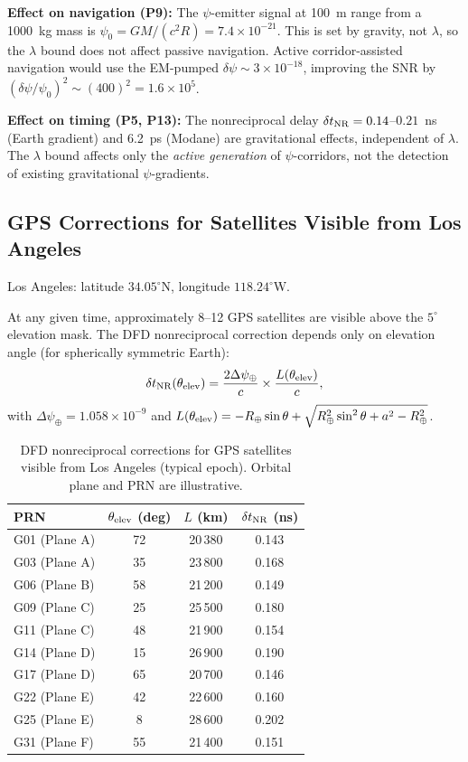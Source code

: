 \documentclass[aps,prd,twocolumn,superscriptaddress,nofootinbib]{revtex4-2}
\begin{document}
\textbf{Effect on navigation (P9):}  The $\psi$-emitter signal at
100~m range from a 1000~kg mass is
$\psi_0 = GM/(c^2 R) = 7.4\times10^{-21}$.  This is set by gravity,
not $\lambda$, so the $\lambda$ bound does not affect passive navigation.
Active corridor-assisted navigation would use the EM-pumped
$\delta\psi \sim 3\times10^{-18}$, improving the SNR by
$(\delta\psi/\psi_0)^2 \sim (400)^2 = 1.6\times10^5$.

\textbf{Effect on timing (P5, P13):}  The nonreciprocal delay
$\delta t_{\rm NR} = 0.14$--$0.21$~ns (Earth gradient) and
6.2~ps (Modane) are gravitational effects, independent of $\lambda$.
The $\lambda$ bound affects only the \emph{active generation} of
$\psi$-corridors, not the detection of existing gravitational
$\psi$-gradients.

\subsection{GPS Corrections for Satellites Visible from Los Angeles}

Los Angeles: latitude $34.05^\circ$N, longitude $118.24^\circ$W.

At any given time, approximately 8--12 GPS satellites are visible above
the $5^\circ$ elevation mask.  The DFD nonreciprocal correction depends
only on elevation angle (for spherically symmetric Earth):
\begin{equation}
\delta t_{\rm NR}(\theta_{\rm elev})
= \frac{2\Delta\psi_\oplus}{c}\times\frac{L(\theta_{\rm elev})}{c},
\end{equation}
with $\Delta\psi_\oplus = 1.058\times10^{-9}$ and
$L(\theta_{\rm elev}) = -R_\oplus\sin\theta + \sqrt{R_\oplus^2\sin^2\theta + a^2 - R_\oplus^2}$.

\begin{table}[h]
\caption{DFD nonreciprocal corrections for GPS satellites visible from
Los Angeles (typical epoch).  Orbital plane and PRN are illustrative.}
\begin{ruledtabular}
\begin{tabular}{lccc}
PRN & $\theta_{\rm elev}$ (deg) & $L$ (km) & $\delta t_{\rm NR}$ (ns) \\
\hline
G01 (Plane A) & 72 & 20\,380 & 0.143 \\
G03 (Plane A) & 35 & 23\,800 & 0.168 \\
G06 (Plane B) & 58 & 21\,200 & 0.149 \\
G09 (Plane C) & 25 & 25\,500 & 0.180 \\
G11 (Plane C) & 48 & 21\,900 & 0.154 \\
G14 (Plane D) & 15 & 26\,900 & 0.190 \\
G17 (Plane D) & 65 & 20\,700 & 0.146 \\
G22 (Plane E) & 42 & 22\,600 & 0.160 \\
G25 (Plane E) & 8 & 28\,600 & 0.202 \\
G31 (Plane F) & 55 & 21\,400 & 0.151 \\
\end{tabular}
\end{ruledtabular}
\end{table}
\end{document}
